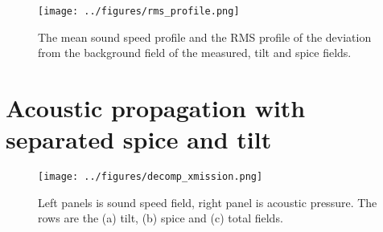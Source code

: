 \documentclass[preprint]{JASA}
\begin{document}
\begin{figure}
\texttt{[image: ../figures/rms\_profile.png]}
    \caption{\label{fig:c_rms}{The mean sound speed profile and the RMS profile of the deviation from the background field of the measured, tilt and spice fields. }}
\end{figure}

\section{\label{sec:propagation}Acoustic propagation with separated spice and tilt}
\begin{figure}
\texttt{[image: ../figures/decomp\_xmission.png]}
    \caption{\label{fig:decomp_x}{Left panels is sound speed field, right panel is acoustic pressure. The rows are the (a) tilt, (b) spice and (c) total fields.}}
\end{figure}




\end{document}
